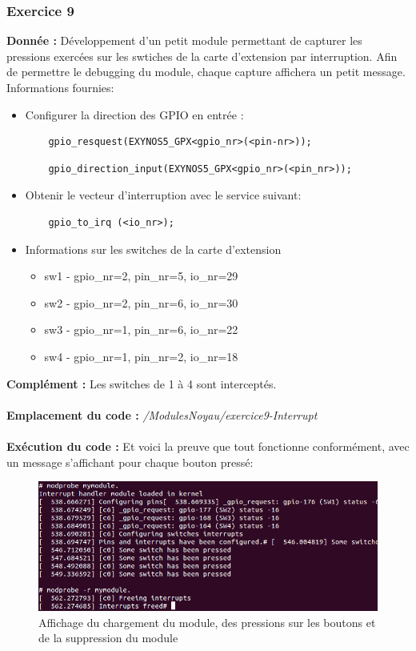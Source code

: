 \subsubsection{Exercice 9}
\textbf{Donnée : }Développement d'un petit module permettant de capturer les pressions exercées sur les swtiches de la carte d'extension par interruption. Afin de permettre le debugging du module, chaque capture affichera un petit message.\\
Informations fournies:
\begin{itemize}
	\item Configurer la direction des GPIO en entrée : 
	\begin{lstlisting}
	gpio_resquest(EXYNOS5_GPX<gpio_nr>(<pin-nr>));
	\end{lstlisting}
	\begin{lstlisting}
	gpio_direction_input(EXYNOS5_GPX<gpio_nr>(<pin_nr>));
	\end{lstlisting}
	\item Obtenir le vecteur d'interruption avec le service suivant:
	\begin{lstlisting}
	gpio_to_irq (<io_nr>);
	\end{lstlisting}
	\item Informations sur les switches de la carte d'extension 
	\begin{itemize}
	\item sw1 - gpio\_nr=2, pin\_nr=5,  io\_nr=29
	\item sw2 - gpio\_nr=2, pin\_nr=6,  io\_nr=30
	\item sw3 - gpio\_nr=1, pin\_nr=6,  io\_nr=22
	\item sw4 - gpio\_nr=1, pin\_nr=2,  io\_nr=18\\
	\end{itemize}
\end{itemize}
\textbf{Complément : } Les switches de 1 à 4 sont interceptés. \\\\
\textbf{Emplacement du code : } \textit{/ModulesNoyau/exercice9-Interrupt}\\\\
\textbf{Exécution du code : }
Et voici la preuve que tout fonctionne conformément, avec un message s'affichant pour chaque bouton pressé:
\begin{figure}[H]
	\begin{center}
		\includegraphics[width=14cm]{img/interrupt_success.png}
		\caption{Affichage du chargement du module, des pressions sur les boutons et de la suppression du module}
		\label{ser1ex9}
	\end{center}
\end{figure}
